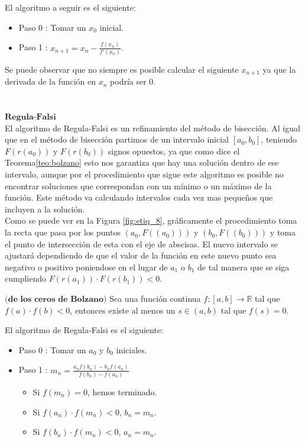 El algoritmo a seguir es el siguiente:

\begin{itemize}
	\item Paso 0 : Tomar un $x_0$ inicial.
	\item Paso 1 : $x_{n+1} = x_n - \frac{f(x_n)}{f'(x_n)}$.
\end{itemize}

Se puede observar que no siempre es posible calcular el siguiente $x_{n+1}$ ya que la derivada de la función en $x_{n}$ podría ser $0$.
${ }$\\
${ }$\\

${ }$\\
$\textbf{Regula-Falsi}$
${ }$\\

El algoritmo de Regula-Falsi es un refinamiento del método de bisección. Al igual que en el método de bisección partimos de un intervalo inicial $[a_0, b_0]$, teniendo $F(r(a_0))$ y $F(r(b_0))$ signos opuestos, ya que como dice el Teorema\ref{teo:bolzano} esto nos garantiza que hay una solución dentro de ese intervalo, aunque por el procedimiento que sigue este algoritmo es posible no encontrar soluciones que correspondan con un mínimo o un máximo de la función. Este método va calculando intervalos cada vez mas pequeños que incluyen a la solución.
${ }$\\

Como se puede ver en la Figura \ref{fig:etiq_8}, gráficamente el procedimiento toma la recta que pasa por los puntos $(a_0, F((a_0)))$ y $(b_0, F((b_0)))$ y toma el punto de intersección de esta con el eje de abscisas. El nuevo intervalo se ajustará dependiendo de que el valor de la función en este nuevo punto sea negativo o positivo poniendose en el lugar de $a_1$ o $b_1$ de tal manera que se siga cumpliendo $F(r(a_1)) \cdot F(r(b_1)) < 0$.

\begin{teorema}\label{teo:bolzano}
	$\textbf{(de los ceros de Bolzano)}$ Sea una función continua $f : [a,b] \to \mathbb{R}$ tal que $f(a) \cdot f(b) < 0$, entonces existe al menos un $s \in (a,b)$ tal que $f(s) = 0$.
\end{teorema}



El algoritmo de Regula-Falsi es el siguiente:

\begin{itemize}
	\item Paso 0 : Tomar un $a_0$ y $b_0$ iniciales.
	\item Paso 1 : $m_n = \frac{a_n f(b_n) - b_n f(a_n)}{f(b_n) - f(a_n)}$
	\begin{itemize}
		\item Si $f(m_n)=0$, hemos terminado.
		\item Si $f(a_n) \cdot f(m_n) < 0$, $b_n = m_n$.
		\item Si $f(b_n) \cdot f(m_n) < 0$, $a_n = m_n$.
	\end{itemize}
\end{itemize}

